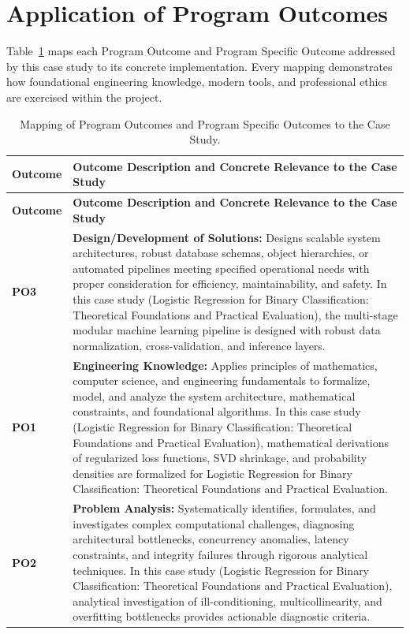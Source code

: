 \section{Application of Program Outcomes}
Table~\ref{tab:po} maps each Program Outcome and Program Specific Outcome addressed by this case study to its concrete implementation. Every mapping demonstrates how foundational engineering knowledge, modern tools, and professional ethics are exercised within the project.

{\small
\begin{longtable}{@{}>{\centering\arraybackslash}p{1.8cm} p{13.2cm}@{}}
    \caption{Mapping of Program Outcomes and Program Specific Outcomes to the Case Study.}\label{tab:po}\\
    \toprule
    \textbf{Outcome} & \textbf{Outcome Description and Concrete Relevance to the Case Study} \\
    \midrule
    \endfirsthead
    \toprule
    \textbf{Outcome} & \textbf{Outcome Description and Concrete Relevance to the Case Study} \\
    \midrule
    \endhead
\textbf{PO3} & \textbf{Design/Development of Solutions:} Designs scalable system architectures, robust database schemas, object hierarchies, or automated pipelines meeting specified operational needs with proper consideration for efficiency, maintainability, and safety. In this case study (Logistic Regression for Binary Classification: Theoretical Foundations and Practical Evaluation), the multi-stage modular machine learning pipeline is designed with robust data normalization, cross-validation, and inference layers. \\
    \addlinespace
\textbf{PO1} & \textbf{Engineering Knowledge:} Applies principles of mathematics, computer science, and engineering fundamentals to formalize, model, and analyze the system architecture, mathematical constraints, and foundational algorithms. In this case study (Logistic Regression for Binary Classification: Theoretical Foundations and Practical Evaluation), mathematical derivations of regularized loss functions, SVD shrinkage, and probability densities are formalized for Logistic Regression for Binary Classification: Theoretical Foundations and Practical Evaluation. \\
    \addlinespace
\textbf{PO2} & \textbf{Problem Analysis:} Systematically identifies, formulates, and investigates complex computational challenges, diagnosing architectural bottlenecks, concurrency anomalies, latency constraints, and integrity failures through rigorous analytical techniques. In this case study (Logistic Regression for Binary Classification: Theoretical Foundations and Practical Evaluation), analytical investigation of ill-conditioning, multicollinearity, and overfitting bottlenecks provides actionable diagnostic criteria. \\

\end{longtable}}
